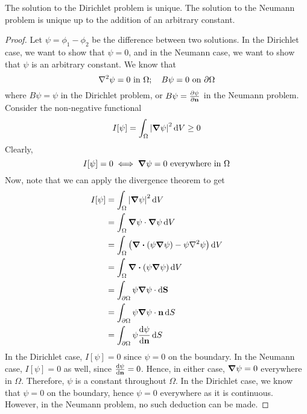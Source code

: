 \begin{proposition}
	The solution to the Dirichlet problem is unique.
	The solution to the Neumann problem is unique up to the addition of an arbitrary constant.
\end{proposition}
\begin{proof}
	Let \(\psi = \phi_1 - \phi_2\) be the difference between two solutions.
	In the Dirichlet case, we want to show that \(\psi = 0\), and in the Neumann case, we want to show that \(\psi\) is an arbitrary constant.
	We know that
	\[
		\laplacian{\psi} = 0 \text{ in } \Omega;\quad B\psi = 0 \text{ on } \partial\Omega
	\]
	where \(B\psi = \psi\) in the Dirichlet problem, or \(B\psi = \pdv{\psi}{\vb n}\) in the Neumann problem.
	Consider the non-negative functional
	\[
		I[\psi] = \int_\Omega \abs{\grad{\psi}}^2 \dd{V} \geq 0
	\]
	Clearly,
	\[
		I[\psi] = 0 \iff \grad{\psi} = 0 \text{ everywhere in } \Omega
	\]
	Now, note that we can apply the divergence theorem to get
	\begin{align*}
		I[\psi] & = \int_\Omega \abs{\grad{\psi}}^2 \dd{V}                                          \\
		        & = \int_\Omega \grad{\psi} \cdot \grad{\psi} \dd{V}                                \\
		        & = \int_\Omega \left( \div(\psi \grad{\psi}) - \psi\laplacian{\psi} \right) \dd{V} \\
		        & = \int_\Omega \div(\psi \grad{\psi}) \dd{V}                                       \\
		        & = \int_{\partial\Omega} \psi \grad{\psi} \cdot\dd{\vb S}                          \\
		        & = \int_{\partial\Omega} \psi \grad{\psi} \cdot \vb n \dd{S}                       \\
		        & = \int_{\partial\Omega} \psi \dv{\psi}{\vb n} \dd{S}                              \\
	\end{align*}
	In the Dirichlet case, \(I[\psi] = 0\) since \(\psi = 0\) on the boundary.
	In the Neumann case, \(I[\psi] = 0\) as well, since \(\dv{\psi}{\vb n} = 0\).
	Hence, in either case, \(\grad{\psi} = 0\) everywhere in \(\Omega\).
	Therefore, \(\psi\) is a constant throughout \(\Omega\).
	In the Dirichlet case, we know that \(\psi = 0\) on the boundary, hence \(\psi = 0\) everywhere as it is continuous.
	However, in the Neumann problem, no such deduction can be made.
\end{proof}
